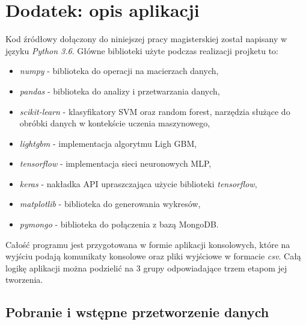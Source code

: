 \documentclass[a4paper, twoside, 11pt, openright]{article}
\begin{document}

\listoffigures

\newpage 


\listoftables

\newpage


\section*{Dodatek: opis aplikacji}


Kod źródłowy dołączony do niniejszej pracy magisterskiej został napisany w języku \textit{Python 3.6}. Główne biblioteki użyte podczas realizacji projketu to:
\begin{itemize}
    \item \textit{numpy} - biblioteka do operacji na macierzach danych,
    \item \textit{pandas} - biblioteka do analizy i przetwarzania danych,
    \item \textit{scikit-learn} - klasyfikatory SVM oraz random forest, narzędzia służące do obróbki danych w kontekście uczenia maszynowego,
    \item \textit{lightgbm} - implementacja algorytmu Ligh GBM,
    \item \textit{tensorflow} - implementacja sieci neuronowych MLP,
    \item \textit{keras} - nakładka API upraszczająca użycie biblioteki \textit{tensorflow},
    \item \textit{matplotlib} - biblioteka do generowania wykresów,
    \item \textit{pymongo} - biblioteka do połączenia z bazą MongoDB.
\end{itemize}

Całość programu jest przygotowana w formie aplikacji konsolowych, które na wyjściu podają komunikaty konsolowe oraz pliki wyjściowe w formacie \textit{csv}. Całą logikę aplikacji można podzielić na 3 grupy odpowiadające trzem etapom jej tworzenia.

\bigskip

\subsection*{Pobranie i wstępne przetworzenie danych}
\end{document}
